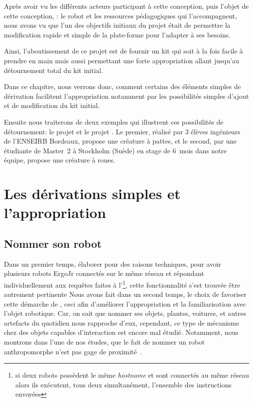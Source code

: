 \label{sec:derivation}
\begin{resumChap}
Après avoir vu les différents acteurs participant à cette conception, puis  l'objet de cette conception, \cad: le robot  et les ressources pédagogiques qui l'accompagnent, nous avons vu que l'un des objectifs initiaux du projet était de permettre la modification rapide et simple de la plate-forme pour l'adapter à ses besoins.\par%
Ainsi, l'aboutissement de ce projet est de fournir un kit qui soit à la fois facile à prendre en main mais aussi permettant une forte appropriation allant jusqu'au détournement total du kit initial.\par%
Dans ce chapitre, nous verrons donc, comment certains des éléments simples de dérivation facilitent l'appropriation notamment par les possibilités simples d'ajout et de modification du kit initial.\par%
Ensuite nous traiterons de deux exemples qui illustrent ces possibilités de détournement: le projet  et le projet . Le premier, réalisé par 3 élèves ingénieurs de l'ENSEIRB Bordeaux, propose une créature à pattes, et le second, par une étudiante de Master~2  à Stockholm (Suède) en stage de 6~mois dans notre équipe, propose une créature à roues.
\end{resumChap}
\section{Les dérivations simples et l'appropriation}
    \subsection{Nommer son robot}
        Dans un premier temps, élaborer pour des raisons techniques, \cad pour avoir plusieurs robots ErgoJr connectés sur le même réseau et répondant individuellement aux requêtes faites à l'\footnote{si deux robots possèdent le même \textit{hostname} et sont connectés au même réseau alors ils exécutent, tous deux simultanément, l'ensemble des instructions envoyées}, cette fonctionnalité s'est trouvée être autrement pertinente
        Nous avons fait dans un second temps, le choix de favoriser cette démarche de , ceci afin d'améliorer l'appropriation et la familiarisation avec l'objet robotique. Car, on sait que nommer ses objets, plantes, voitures, et autres artefacts du quotidien nous rapproche d'eux, cependant, ce type de mécanisme chez des objets capables d'interaction est encore mal étudié. Notamment, nous montrons dans l'une de nos études, que le fait de nommer un robot anthropomorphe n'est pas gage de proximité~.
